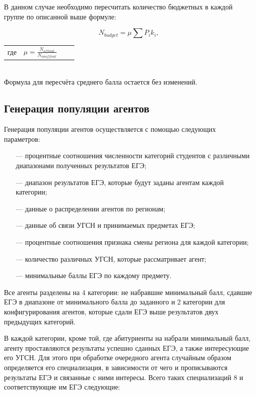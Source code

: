 В данном случае необходимо пересчитать количество бюджетных в каждой группе по описанной выше формуле:

\begin{equation}
N_{budget} = \mu \sum P_{i} k_{i},
\end{equation}
\begin{tabular}{llll}
    где & $\mu = \frac{N_{offical}}{N_{unoffical}}$ \\
\end{tabular} \\


Формула для пересчёта среднего балла остается без изменений.


\subsection{Генерация популяции агентов}

Генерация популяции агентов осуществляется с помощью следующих параметров:

\begin{itemize}[leftmargin=1.6\parindent]
	\item[---] процентные соотношения численности категорий студентов с различными диапазонами полученных результатов ЕГЭ;
	\item[---] диапазон результатов ЕГЭ, которые будут заданы агентам каждой категории;
	\item[---] данные о распределении агентов по регионам;
	\item[---] данные об связи УГСН и принимаемых предметах ЕГЭ;
	\item[---] процентные соотношения признака смены региона для каждой категории;
	\item[---] количество различных УГСН, которые рассматривает агент;
	\item[---] минимальные баллы ЕГЭ по каждому предмету.
\end{itemize}

Все агенты разделены на 4 категории: не набравшие минимальный балл, сдавшие ЕГЭ в диапазоне от минимального балла до заданного и 2 категории для конфигурирования агентов, которые сдали ЕГЭ выше результатов двух предыдущих категорий.

В каждой категории, кроме той, где абитуриенты на набрали минимальный балл, агенту проставляются результаты успешно сданных ЕГЭ, а также интересующие его УГСН. Для этого при обработке очередного агента случайным образом определяется его специализация, в зависимости от чего и прописываются результаты ЕГЭ и связанные с ними интересы. Всего таких специализаций 8 и соответствующие им ЕГЭ следующие:

